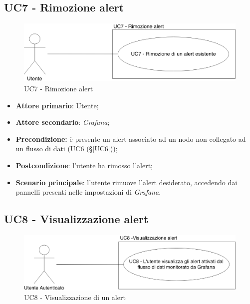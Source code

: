 \newpage

\subsection{UC7 - Rimozione alert}\label{UC7}

\begin{figure}[H]
	\centering
	\includegraphics[scale=0.4]{./images/UC7.png}
	\caption{UC7 - Rimozione alert}
\end{figure}

\begin{itemize}
	\item \textbf{Attore primario}: Utente;
	\item \textbf{Attore secondario}: \textit{Grafana};
	\item \textbf{Precondizione:} è presente un alert associato ad un nodo non collegato ad un flusso di dati
	(\hyperref[UC6]{UC6 (§\ref*{UC6})});
	\item \textbf{Postcondizione}: l'utente ha rimosso l'alert;
	\item \textbf{Scenario principale}: l'utente rimuove l'alert desiderato, accedendo dai pannelli presenti nelle impostazioni di \textit{Grafana}.
\end{itemize}

\pagebreak

\subsection{UC8 - Visualizzazione alert}\label{UC8}

\begin{figure}[H]
	\centering
	\includegraphics[scale=0.4]{./images/UC8.png}
	\caption{UC8 - Visualizzazione di un alert}
\end{figure}

